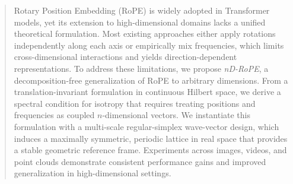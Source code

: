 \documentclass{article}
\theoremstyle{plain}
\theoremstyle{definition}
\theoremstyle{remark}
\begin{document}



\printAffiliationsAndNotice{}  %

\begin{abstract}
Rotary Position Embedding (RoPE) is widely adopted in Transformer models, yet its extension to high-dimensional domains lacks a unified theoretical formulation. Most existing approaches either apply rotations independently along each axis or empirically mix frequencies, which limits cross-dimensional interactions and yields direction-dependent representations. To address these limitations, we propose \textit{nD-RoPE}, a decomposition-free generalization of RoPE to arbitrary dimensions. From a translation-invariant formulation in continuous Hilbert space, we derive a spectral condition for isotropy that requires treating positions and frequencies as coupled $n$-dimensional vectors. We instantiate this formulation with a multi-scale regular-simplex wave-vector design, which induces a maximally symmetric, periodic lattice in real space that provides a stable geometric reference frame. Experiments across images, videos, and point clouds demonstrate consistent performance gains and improved generalization in high-dimensional settings.
\end{abstract}
\end{document}
